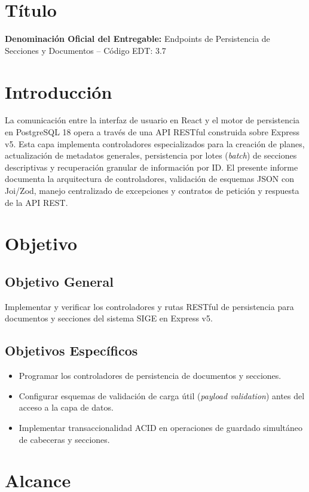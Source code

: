 \documentclass[12pt,a4paper]{article}
\begin{document}
\section{Título}
\textbf{Denominación Oficial del Entregable:} Endpoints de Persistencia de Secciones y Documentos -- Código EDT: 3.7

\section{Introducción}
La comunicación entre la interfaz de usuario en React y el motor de persistencia en PostgreSQL 18 opera a través de una API RESTful construida sobre Express v5. Esta capa implementa controladores especializados para la creación de planes, actualización de metadatos generales, persistencia por lotes (\textit{batch}) de secciones descriptivas y recuperación granular de información por ID. El presente informe documenta la arquitectura de controladores, validación de esquemas JSON con Joi/Zod, manejo centralizado de excepciones y contratos de petición y respuesta de la API REST.

\section{Objetivo}
\subsection{Objetivo General}
Implementar y verificar los controladores y rutas RESTful de persistencia para documentos y secciones del sistema SIGE en Express v5.
\subsection{Objetivos Específicos}
\begin{itemize}[leftmargin=1.5em, itemsep=2pt]
    \item Programar los controladores de persistencia de documentos y secciones.
    \item Configurar esquemas de validación de carga útil (\textit{payload validation}) antes del acceso a la capa de datos.
    \item Implementar transaccionalidad ACID en operaciones de guardado simultáneo de cabeceras y secciones.
\end{itemize}

\section{Alcance}
\end{document}
